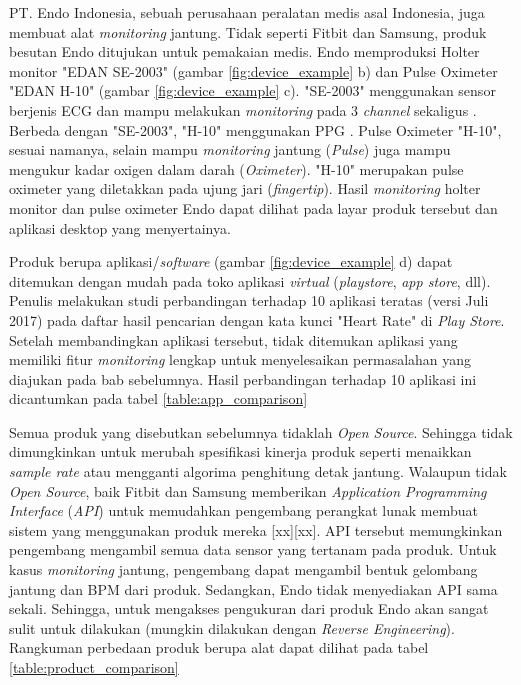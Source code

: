 PT. Endo Indonesia, sebuah perusahaan peralatan medis asal Indonesia, juga membuat alat \textit{monitoring} jantung. Tidak seperti Fitbit dan Samsung, produk besutan Endo ditujukan untuk pemakaian medis. Endo memproduksi Holter monitor "EDAN SE-2003" (gambar \ref{fig:device_example} b) dan Pulse Oximeter "EDAN H-10" (gambar \ref{fig:device_example} c). "SE-2003" menggunakan sensor berjenis ECG dan mampu melakukan \textit{monitoring} pada 3 \textit{channel} sekaligus \cite{endo_holter}. Berbeda dengan "SE-2003", "H-10" menggunakan PPG \cite{endo_oxi}. Pulse Oximeter "H-10", sesuai namanya, selain mampu \textit{monitoring} jantung (\textit{Pulse}) juga mampu mengukur kadar oxigen dalam darah (\textit{Oximeter}). "H-10" merupakan pulse oximeter yang diletakkan pada ujung jari (\textit{fingertip}). Hasil \textit{monitoring} holter monitor dan pulse oximeter Endo dapat dilihat pada layar produk tersebut dan aplikasi desktop yang menyertainya.

Produk berupa aplikasi/\textit{software} (gambar \ref{fig:device_example} d) dapat ditemukan dengan mudah pada toko aplikasi \textit{virtual} (\textit{playstore}, \textit{app store}, dll). Penulis melakukan studi perbandingan terhadap 10 aplikasi teratas (versi Juli 2017) pada daftar hasil pencarian dengan kata kunci "Heart Rate" di \textit{Play Store}. Setelah membandingkan aplikasi tersebut, tidak ditemukan aplikasi yang memiliki fitur \textit{monitoring} lengkap untuk menyelesaikan permasalahan yang diajukan pada bab sebelumnya. Hasil perbandingan terhadap 10 aplikasi ini dicantumkan pada tabel \ref{table:app_comparison}

Semua produk yang disebutkan sebelumnya tidaklah \textit{Open Source}. Sehingga tidak dimungkinkan untuk merubah spesifikasi kinerja produk seperti menaikkan \textit{sample rate} atau mengganti algorima penghitung detak jantung. Walaupun tidak \textit{Open Source}, baik Fitbit dan Samsung memberikan \textit{Application Programming Interface} (\textit{API}) untuk memudahkan pengembang perangkat lunak membuat sistem yang menggunakan produk mereka [xx][xx]. API tersebut memungkinkan pengembang mengambil semua data sensor yang tertanam pada produk. Untuk kasus \textit{monitoring} jantung, pengembang dapat mengambil bentuk gelombang jantung dan BPM dari produk. Sedangkan, Endo tidak menyediakan API sama sekali. Sehingga, untuk mengakses pengukuran dari produk Endo akan sangat sulit untuk dilakukan (mungkin dilakukan dengan \textit{Reverse Engineering}). Rangkuman perbedaan produk berupa alat dapat dilihat pada tabel \ref{table:product_comparison}

